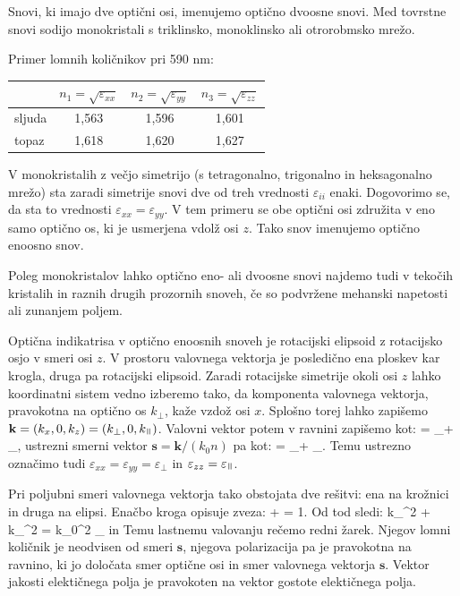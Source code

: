 Snovi, ki imajo dve optični osi, imenujemo optično dvoosne snovi. Med tovrstne snovi sodijo
monokristali s triklinsko, monoklinsko ali otrorobmsko mrežo. 

Primer lomnih količnikov pri 590 nm:
\begin{center}
\begin{tabular}{|l|c|c|c|}
\hline
 & $n_1 = \sqrt{\varepsilon_{xx}}$ & $n_2 = \sqrt{\varepsilon_{yy}}$ & $n_3 = \sqrt{\varepsilon_{zz}}$\\ \hline
  sljuda & 1,563 & 1,596 & 1,601\\ \hline
topaz & 1,618 & 1,620 & 1,627 \\ \hline
\end{tabular}
\end{center}

V monokristalih z večjo simetrijo (s tetragonalno, trigonalno in heksagonalno mrežo) sta
zaradi simetrije snovi dve od treh vrednosti $\varepsilon_{ii}$ enaki. Dogovorimo se, da sta 
to vrednosti $\varepsilon_{xx} = \varepsilon_{yy}$. V tem primeru se obe optični osi združita
v eno samo optično os, ki je usmerjena vdolž osi $z$. Tako snov imenujemo optično enoosno snov. 

Poleg monokristalov lahko optično eno- ali dvoosne snovi najdemo tudi v tekočih kristalih in raznih
drugih prozornih snoveh, če so podvržene mehanski napetosti ali zunanjem poljem.

Optična indikatrisa v optično enoosnih snoveh je rotacijski elipsoid z rotacijsko osjo v smeri osi $z$. 
V prostoru valovnega vektorja je posledično ena ploskev kar krogla, druga pa rotacijski elipsoid.
Zaradi rotacijske  simetrije okoli osi $z$ lahko koordinatni sistem vedno izberemo tako, da
komponenta valovnega vektorja, pravokotna na optično os $k_\perp$, kaže vzdož osi $x$. Splošno 
torej lahko zapišemo $\mathbf{k} = (k_x, 0, k_z) = (k_\perp, 0, k_\myparallel)$. 
Valovni vektor potem v ravnini zapišemo kot:
\beq
{} = _\perp + _\myparallel,
\eeq
ustrezni smerni vektor $\mathbf{s}= \mathbf{k}/(k_0n)$ pa kot:
\beq
{} = _\perp + _\myparallel.
\eeq
Temu ustrezno označimo tudi $\varepsilon_{xx} = \varepsilon_{yy} = \varepsilon_\perp$ in 
$\varepsilon_{zz} = \varepsilon_\myparallel$. 

Pri poljubni smeri valovnega vektorja tako obstojata dve rešitvi: ena na krožnici in druga
na elipsi. Enačbo kroga opisuje zveza:
\beq
{}+  = 1.
\eeq
Od tod sledi:
\beq
k_\perp^2 + k_\myparallel^2 = k_0^2 \varepsilon_\perp
\eeq
in
Temu lastnemu valovanju rečemo redni žarek. Njegov lomni količnik je neodvisen od smeri $\mathbf{s}$,
njegova polarizacija pa je pravokotna na ravnino, ki jo določata smer optične osi in smer valovnega
vektorja $\mathbf{s}$. Vektor jakosti elektičnega polja je pravokoten na vektor gostote elektičnega polja. 

